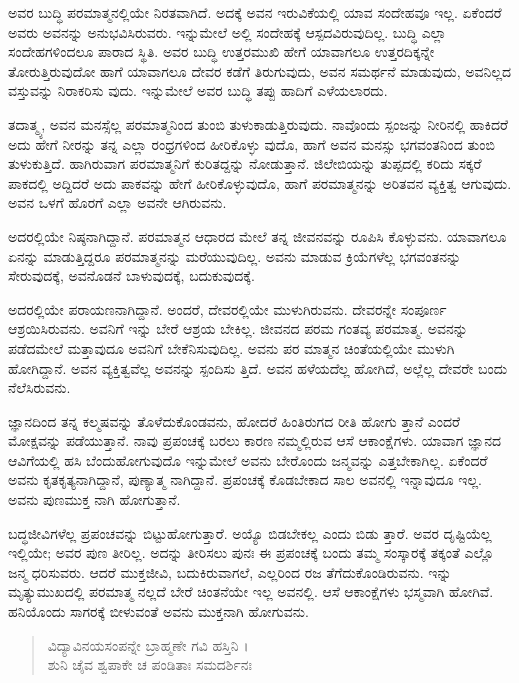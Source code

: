 ಅವರ ಬುದ್ಧಿ ಪರಮಾತ್ಮನಲ್ಲಿಯೇ ನಿರತವಾಗಿದೆ. ಅದಕ್ಕೆ ಅವನ ಇರುವಿಕೆಯಲ್ಲಿ ಯಾವ ಸಂದೇಹವೂ ಇಲ್ಲ. ಏಕೆಂದರೆ ಅವರು ಅವನನ್ನು ಅನುಭವಿಸಿರುವರು. ಇನ್ನುಮೇಲೆ ಅಲ್ಲಿ ಸಂದೇಹಕ್ಕೆ ಆಸ್ಪದವಿರುವುದಿಲ್ಲ. ಬುದ್ಧಿ ಎಲ್ಲಾ ಸಂದೇಹಗಳಿಂದಲೂ ಪಾರಾದ ಸ್ಥಿತಿ. ಅವರ ಬುದ್ಧಿ ಉತ್ತರಮುಖಿ ಹೇಗೆ ಯಾವಾಗಲೂ ಉತ್ತರದಿಕ್ಕನ್ನೇ ತೋರುತ್ತಿರುವುದೋ ಹಾಗೆ ಯಾವಾಗಲೂ ದೇವರ ಕಡೆಗೆ ತಿರುಗುವುದು, ಅವನ ಸಮರ್ಥನೆ ಮಾಡುವುದು, ಅವನಿಲ್ಲದ ವಸ್ತುವನ್ನು ನಿರಾಕರಿಸು ವುದು. ಇನ್ನುಮೇಲೆ ಅವರ ಬುದ್ಧಿ ತಪ್ಪು ಹಾದಿಗೆ ಎಳೆಯಲಾರದು.

ತದಾತ್ಮ್ಯ, ಅವನ ಮನಸ್ಸೆಲ್ಲ ಪರಮಾತ್ಮನಿಂದ ತುಂಬಿ ತುಳುಕಾಡುತ್ತಿರುವುದು. ನಾವೊಂದು ಸ್ಪಂಜನ್ನು ನೀರಿನಲ್ಲಿ ಹಾಕಿದರೆ ಅದು ಹೇಗೆ ನೀರನ್ನು ತನ್ನ ಎಲ್ಲಾ ರಂಧ್ರಗಳಿಂದ ಹೀರಿಕೊಳ್ಳು ವುದೊ, ಹಾಗೆ ಅವನ ಮನಸ್ಸು ಭಗವಂತನಿಂದ ತುಂಬಿ ತುಳುಕುತ್ತಿದೆ. ಹಾಗಿರುವಾಗ ಪರಮಾತ್ಮನಿಗೆ ಕುರಿತದ್ದನ್ನು ನೋಡುತ್ತಾನೆ. ಜಿಲೇಬಿಯನ್ನು ತುಪ್ಪದಲ್ಲಿ ಕರಿದು ಸಕ್ಕರೆ ಪಾಕದಲ್ಲಿ ಅದ್ದಿದರೆ ಅದು ಪಾಕವನ್ನು ಹೇಗೆ ಹೀರಿಕೊಳ್ಳುವುದೊ, ಹಾಗೆ ಪರಮಾತ್ಮನನ್ನು ಅರಿತವನ ವ್ಯಕ್ತಿತ್ವ ಆಗುವುದು. ಅವನ ಒಳಗೆ ಹೊರಗೆ ಎಲ್ಲಾ ಅವನೇ ಆಗಿರುವನು.

ಅದರಲ್ಲಿಯೇ ನಿಷ್ಠನಾಗಿದ್ದಾನೆ. ಪರಮಾತ್ಮನ ಆಧಾರದ ಮೇಲೆ ತನ್ನ ಜೀವನವನ್ನು ರೂಪಿಸಿ ಕೊಳ್ಳುವನು. ಯಾವಾಗಲೂ ಏನನ್ನು ಮಾಡುತ್ತಿದ್ದರೂ ಪರಮಾತ್ಮನನ್ನು ಮರೆಯುವುದಿಲ್ಲ. ಅವನು ಮಾಡುವ ಕ್ರಿಯೆಗಳೆಲ್ಲ ಭಗವಂತನನ್ನು ಸೇರುವುದಕ್ಕೆ, ಅವನೊಡನೆ ಬಾಳುವುದಕ್ಕೆ, ಬದುಕುವುದಕ್ಕೆ.

ಅದರಲ್ಲಿಯೇ ಪರಾಯಣನಾಗಿದ್ದಾನೆ. ಅಂದರೆ, ದೇವರಲ್ಲಿಯೇ ಮುಳುಗಿರುವನು. ದೇವರನ್ನೇ ಸಂಪೂರ್ಣ ಆಶ್ರಯಿಸಿರುವನು. ಅವನಿಗೆ ಇನ್ನು ಬೇರೆ ಆಶ್ರಯ ಬೇಕಿಲ್ಲ. ಜೀವನದ ಪರಮ ಗಂತವ್ಯ ಪರಮಾತ್ಮ. ಅವನನ್ನು ಪಡೆದಮೇಲೆ ಮತ್ತಾವುದೂ ಅವನಿಗೆ ಬೇಕೆನಿಸುವುದಿಲ್ಲ. ಅವನು ಪರ ಮಾತ್ಮನ ಚಿಂತೆಯಲ್ಲಿಯೇ ಮುಳುಗಿ ಹೋಗಿದ್ದಾನೆ. ಅವನ ವ್ಯಕ್ತಿತ್ವವೆಲ್ಲ ಅವನನ್ನು ಸ್ಪಂದಿಸು ತ್ತಿದೆ. ಅವನ ಹಳೆಯದೆಲ್ಲ ಹೋಗಿದೆ, ಅಲ್ಲೆಲ್ಲ ದೇವರೇ ಬಂದು ನೆಲೆಸಿರುವನು.

ಜ್ಞಾನದಿಂದ ತನ್ನ ಕಲ್ಮಷವನ್ನು ತೊಳೆದುಕೊಂಡವನು, ಹೋದರೆ ಹಿಂತಿರುಗದ ರೀತಿ ಹೋಗು ತ್ತಾನೆ ಎಂದರೆ ಮೋಕ್ಷವನ್ನು ಪಡೆಯುತ್ತಾನೆ. ನಾವು ಪ್ರಪಂಚಕ್ಕೆ ಬರಲು ಕಾರಣ ನಮ್ಮಲ್ಲಿರುವ ಆಸೆ ಆಕಾಂಕ್ಷೆಗಳು. ಯಾವಾಗ ಜ್ಞಾನದ ಆವಿಗೆಯಲ್ಲಿ ಹಸಿ ಬೆಂದುಹೋಗುವುದೊ ಇನ್ನುಮೇಲೆ ಅವನು ಬೇರೊಂದು ಜನ್ಮವನ್ನು ಎತ್ತಬೇಕಾಗಿಲ್ಲ. ಏಕೆಂದರೆ ಅವನು ಕೃತಕೃತ್ಯನಾಗಿದ್ದಾನೆ, ಪುಣ್ಯಾತ್ಮ ನಾಗಿದ್ದಾನೆ. ಪ್ರಪಂಚಕ್ಕೆ ಕೊಡಬೇಕಾದ ಸಾಲ ಅವನಲ್ಲಿ ಇನ್ನಾವುದೂ ಇಲ್ಲ. ಅವನು ಪುಣಮುಕ್ತ ನಾಗಿ ಹೋಗುತ್ತಾನೆ.

ಬದ್ಧಜೀವಿಗಳೆಲ್ಲ ಪ್ರಪಂಚವನ್ನು ಬಿಟ್ಟುಹೋಗುತ್ತಾರೆ. ಅಯ್ಯೊ ಬಿಡಬೇಕಲ್ಲ ಎಂದು ಬಿಡು ತ್ತಾರೆ. ಅವರ ದೃಷ್ಟಿಯೆಲ್ಲ ಇಲ್ಲಿಯೇ; ಅವರ ಪುಣ ತೀರಿಲ್ಲ. ಅದನ್ನು ತೀರಿಸಲು ಪುನಃ ಈ ಪ್ರಪಂಚಕ್ಕೆ ಬಂದು ತಮ್ಮ ಸಂಸ್ಕಾರಕ್ಕೆ ತಕ್ಕಂತೆ ಎಲ್ಲೊ ಜನ್ಮ ಧರಿಸುವರು. ಆದರೆ ಮುಕ್ತಜೀವಿ, ಬದುಕಿರುವಾಗಲೆ, ಎಲ್ಲರಿಂದ ರಜ ತೆಗೆದುಕೊಂಡಿರುವನು. ಇನ್ನು ಮೃತ್ಯುಮುಖದಲ್ಲಿ ಪರಮಾತ್ಮ ನಲ್ಲದೆ ಬೇರೆ ಚಿಂತನೆಯೇ ಇಲ್ಲ ಅವನಲ್ಲಿ. ಆಸೆ ಆಕಾಂಕ್ಷೆಗಳು ಭಸ್ಮವಾಗಿ ಹೋಗಿವೆ. ಹನಿಯೊಂದು ಸಾಗರಕ್ಕೆ ಬೀಳುವಂತೆ ಅವನು ಮುಕ್ತನಾಗಿ ಹೋಗುವನು.

\begin{verse}
ವಿದ್ಯಾವಿನಯಸಂಪನ್ನೇ ಬ್ರಾಹ್ಮಣೇ ಗವಿ ಹಸ್ತಿನಿ ।\\ಶುನಿ ಚೈವ ಶ್ವಪಾಕೇ ಚ ಪಂಡಿತಾಃ ಸಮದರ್ಶಿನಃ 
\end{verse}

